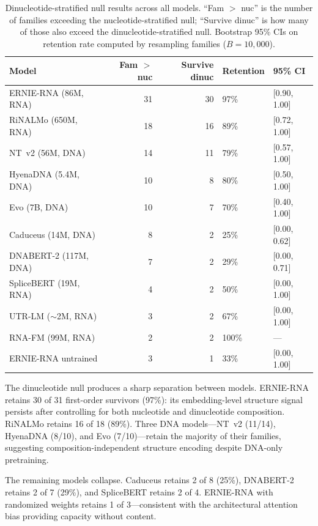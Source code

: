 \documentclass[11pt]{article}
\begin{document}
\begin{table}[htbp]
\centering
\caption{Dinucleotide-stratified null results across all models.
``Fam $>$ nuc'' is the number of families exceeding the
nucleotide-stratified null; ``Survive dinuc'' is how many of those
also exceed the dinucleotide-stratified null. Bootstrap 95\% CIs
on retention rate computed by resampling families ($B = 10{,}000$).}
\label{tab:rung2}
\small
\begin{tabular}{lrrll}
\toprule
\textbf{Model} & \textbf{Fam $>$ nuc} & \textbf{Survive dinuc} & \textbf{Retention} & \textbf{95\% CI} \\
\midrule
ERNIE-RNA (86M, RNA)    & 31 & 30 & 97\% & [0.90, 1.00] \\
RiNALMo (650M, RNA)     & 18 & 16 & 89\% & [0.72, 1.00] \\
NT~v2 (56M, DNA)        & 14 & 11 & 79\% & [0.57, 1.00] \\
HyenaDNA (5.4M, DNA)    & 10 &  8 & 80\% & [0.50, 1.00] \\
Evo (7B, DNA)           & 10 &  7 & 70\% & [0.40, 1.00] \\
Caduceus (14M, DNA)     &  8 &  2 & 25\% & [0.00, 0.62] \\
DNABERT-2 (117M, DNA)   &  7 &  2 & 29\% & [0.00, 0.71] \\
SpliceBERT (19M, RNA)   &  4 &  2 & 50\% & [0.00, 1.00] \\
UTR-LM ($\sim$2M, RNA)  &  3 &  2 & 67\% & [0.00, 1.00] \\
RNA-FM (99M, RNA)       &  2 &  2 & 100\% & --- \\
\midrule
ERNIE-RNA untrained     &  3 &  1 & 33\% & [0.00, 1.00] \\
\bottomrule
\end{tabular}
\end{table}

The dinucleotide null produces a sharp separation between models.
ERNIE-RNA retains 30 of 31 first-order survivors (97\%): its
embedding-level structure signal persists after controlling for both
nucleotide and dinucleotide composition. RiNALMo retains 16 of 18
(89\%). Three DNA models---NT~v2 (11/14), HyenaDNA (8/10), and Evo
(7/10)---retain the majority of their families, suggesting
composition-independent structure encoding despite DNA-only
pretraining.

The remaining models collapse. Caduceus retains 2 of 8 (25\%),
DNABERT-2 retains 2 of 7 (29\%), and SpliceBERT retains 2 of 4.
ERNIE-RNA with randomized weights retains 1 of 3---consistent with
the architectural attention bias providing capacity without content.
\end{document}
